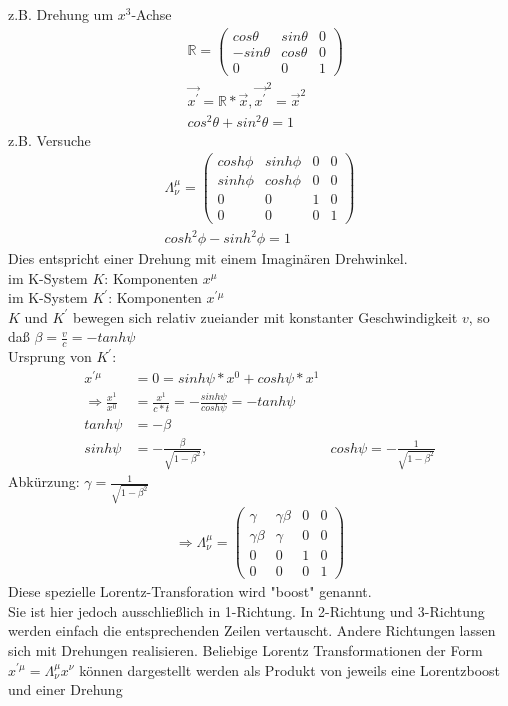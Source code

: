 \documentclass[a4paper]{article}
\begin{document}
z.B. Drehung um $x^3$-Achse
\begin{align}
&\mathbb{R}=\begin{pmatrix} cos\theta & sin\theta & 0 \\ -sin\theta
& cos\theta &0 \\ 0&0&1\end{pmatrix}\\
&\vec{x^{'}}= \mathbb{R}*\vec{x},\vec{x^{'}}^2= \vec{x}^2\\
&cos^2\theta+sin^2\theta=1
\end{align}
z.B. Versuche
\begin{align}
\Lambda^\mu_\nu= \begin{pmatrix} cosh\phi & sinh\phi& 0&0\\ sinh\phi&cosh\phi
&0&0\\0&0 &1&0 \\0&0 &0&1 \end{pmatrix}\\
cosh^2\phi - sinh^2\phi=1
\end{align}
Dies entspricht einer Drehung mit einem Imaginären Drehwinkel.\\
im K-System $K$: Komponenten $x^\mu$\\
im K-System $K^{'}$: Komponenten $x^{'\mu}$\\
$K$ und $K^{'}$ bewegen sich relativ zueiander mit konstanter Geschwindigkeit
$v$, so daß $\beta=\frac{v}{c}=-tanh\psi$\\
Ursprung von $K^{'}$: 
\begin{align}
x^{'\mu}&=0=sinh\psi*x^0+cosh\psi*x^1\\
\Rightarrow
\frac{x^1}{x^0}&=\frac{x^1}{c*t}=-\frac{sinh\psi}{cosh\psi}=-tanh\psi\\
tanh\psi&=-\beta \\
sinh\psi&=-\frac{\beta}{\sqrt{1-\beta^2}}, &
cosh\psi=-\frac{1}{\sqrt{1-\beta^2}}
\end{align}
Abkürzung: $\gamma=\frac{1}{\sqrt{1-\beta^2}}$
\begin{align}
\Rightarrow \Lambda^\mu_\nu= \begin{pmatrix} \gamma & \gamma \beta & 0&0\\
\gamma \beta & \gamma &0&0\\0&0 &1&0 \\0&0 &0&1 \end{pmatrix}
\end{align}
Diese spezielle Lorentz-Transforation wird "boost" genannt.\\
Sie ist hier jedoch ausschließlich in 1-Richtung. In 2-Richtung und 3-Richtung
werden einfach die entsprechenden Zeilen vertauscht. Andere Richtungen lassen
sich mit Drehungen realisieren. Beliebige Lorentz Transformationen der Form
$x^{'\mu}=\Lambda^\mu_\nu x^\nu$ können dargestellt werden als Produkt von
jeweils eine Lorentzboost und einer Drehung
\end{document}
